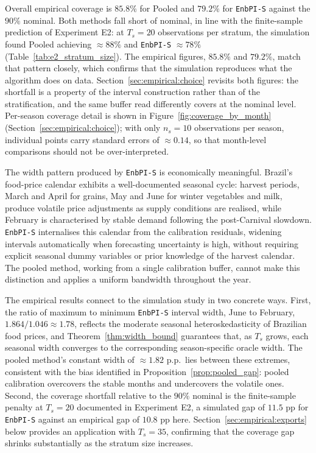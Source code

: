 Overall empirical coverage is $85.8\%$ for Pooled and $79.2\%$ for
\texttt{EnbPI-S} against the $90\%$ nominal.  Both methods fall short
of nominal, in line with the finite-sample prediction of
Experiment E2: at $T_s = 20$ observations per stratum, the simulation
found Pooled achieving $\approx 88\%$ and \texttt{EnbPI-S}
$\approx 78\%$ (Table~\ref{tab:e2_stratum_size}).  The empirical
figures, $85.8\%$ and $79.2\%$, match that pattern closely, which
confirms that the simulation reproduces what the algorithm does on
data.  Section~\ref{sec:empirical:choice} revisits both figures: the
shortfall is a property of the interval construction rather than of
the stratification, and the same buffer read differently covers at the
nominal level.  Per-season
coverage detail is shown in
Figure~\ref{fig:coverage_by_month}
(Section~\ref{sec:empirical:choice}); with only $n_s = 10$ observations
per season, individual points carry standard errors of $\approx 0.14$,
so that month-level comparisons should not be over-interpreted.

The width pattern produced by \texttt{EnbPI-S} is economically
meaningful.  Brazil's food-price calendar exhibits a well-documented
seasonal cycle: harvest periods, March and April for grains, May and
June for winter vegetables and milk, produce volatile price
adjustments as supply conditions are realised, while February is
characterised by stable demand following the post-Carnival slowdown.
\texttt{EnbPI-S} internalises this calendar from the calibration
residuals, widening intervals automatically when forecasting
uncertainty is high, without requiring explicit seasonal dummy
variables or prior knowledge of the harvest calendar.  The pooled
method, working from a single calibration buffer, cannot make this
distinction and applies a uniform bandwidth throughout the year.

The empirical results connect to the simulation study in two concrete
ways.  First, the ratio of maximum to minimum \texttt{EnbPI-S}
interval width, June to February, $1.864/1.046 \approx 1.78$,
reflects the moderate seasonal heteroskedasticity of Brazilian food
prices, and Theorem~\ref{thm:width_bound} guarantees that, as $T_s$
grows, each seasonal width converges to the corresponding
season-specific oracle width.  The pooled method's constant width of
$\approx 1.82$ p.p.\ lies between these extremes, consistent with
the bias identified in Proposition~\ref{prop:pooled_gap}: pooled
calibration overcovers the stable months and undercovers the volatile
ones.  Second, the coverage shortfall relative to the $90\%$ nominal
is the finite-sample penalty at $T_s = 20$ documented in Experiment
E2, a simulated gap of $11.5$ pp for \texttt{EnbPI-S} against an
empirical gap of $10.8$ pp here.
Section~\ref{sec:empirical:exports} below provides an application
with $T_s = 35$, confirming that the coverage gap shrinks
substantially as the stratum size increases.

